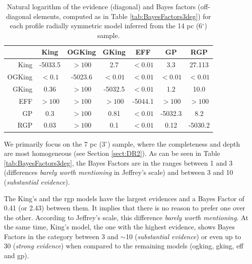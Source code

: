 \begin{table}[ht]
  \centering 
 \caption[]{Natural logarithm of the evidence (diagonal) and Bayes factors (off-diagonal elements, computed as in Table \ref{tab:BayesFactors3deg}) for each profile radially symmetric model inferred from the 14 pc (6$^{\circ}$) sample.}

\begin{tabular}{rcccccc} 
&King & OGKing & GKing & EFF & GP & RGP \\
\hline              
           King    &-5033.5       &  $>100$  &   2.7    &   $<0.01$     &  3.3       &    27.113  \\
           OGKing  &    $<0.1$&  -5023.6 &  $<0.01$ &   $<0.01$     &   $<0.01$  &   $<0.01$   \\
           GKing   &    0.36     &  $>100$   & -5032.5  &   $<0.01$     &  1.2       &   10.0     \\
           EFF     &    $>100$ & $>100$ &    $>100$  &   -5044.1     &  $>100$    &   $>100$   \\
           GP      &   0.3          &   $>100$ &    0.81      &    $<0.01$    &   -5032.3    & 8.2      \\
           RGP     &   0.03      &   $>100$  &    0.1      &     $<0.01$    &   0.12           & -5030.2     \\
         \end{tabular}
 
 \label{tab:BayesFactors6deg}
   \end{table}
  


We primarily focus on the 7 pc (3$^{\circ}$) sample, where the completeness and depth are most homogeneous (see Section \ref{sect:DR2}). As can be seen in Table \ref{tab:BayesFactors3deg}, the Bayes Factors are in the ranges between 1 and 3 (differences \emph{barely worth mentioning} in Jeffrey's scale) and between 3 and 10 (\emph{substantial evidence}).

The King's and the \gls{rgp} models have the largest evidences and a Bayes Factor of 0.41 (or 2.43) between them. It implies that there is no reason to prefer one over the other. According to Jeffrey's scale, this difference \emph{barely worth mentioning}. At the same time, King's model, the one with the highest evidence, shows Bayes Factors in the category between 3 and $\sim$10 (\emph{substantial evidence}) or even up to 30 (\emph{strong evidence}) when compared to the remaining models (\gls{ogking}, \gls{gking}, \gls{eff} and \gls{gp}).  

